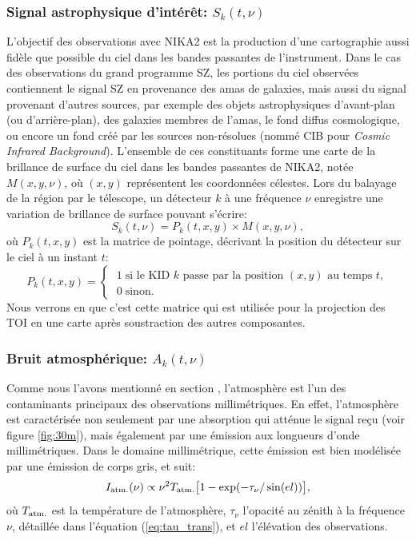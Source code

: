 \subsubsection{Signal astrophysique d'intérêt: $S_k(t, \nu)$} %
L'objectif des observations avec NIKA2 est la production d'une cartographie aussi fidèle que possible du ciel dans les bandes passantes de l'instrument.
Dans le cas des observations du grand programme SZ, les portions du ciel observées contiennent le signal SZ en provenance des amas de galaxies, mais aussi du signal provenant d'autres sources, par exemple des objets astrophysiques d'avant-plan (ou d'arrière-plan), des galaxies membres de l'amas, le fond diffus cosmologique, ou encore un fond créé par les sources non-résolues (nommé CIB pour \textit{Cosmic Infrared Background}).
L'ensemble de ces constituants forme une carte de la brillance de surface du ciel dans les bandes passantes de NIKA2, notée $M(x, y, \nu)$, où $(x, y)$ représentent les coordonnées célestes.
Lors du balayage de la région par le télescope, un détecteur $k$ à une fréquence $\nu$ enregistre une variation de brillance de surface pouvant s'écrire:
\begin{equation}
    \label{eq:toi_to_map}
    S_k(t, \nu) = P_k(t, x, y) \times M(x, y, \nu),
\end{equation}
où $P_k(t, x, y)$ est la matrice de pointage, décrivant la position du détecteur sur le ciel à un instant $t$:
\begin{equation}
    \label{eq:pointing_matrix}
    P_k(t, x, y) =
        \begin{cases}
            \; 1 \;\text{si le KID $k$ passe par la position $(x, y)$ au temps $t$}, \\
            \; 0 \;\text{sinon.}
        \end{cases}
\end{equation}
Nous verrons en  que c'est cette matrice qui est utilisée pour la projection des TOI en une carte après soustraction des autres composantes.

\subsubsection{Bruit atmosphérique: $A_k(t, \nu)$} %
Comme nous l'avons mentionné en section , l'atmosphère est l'un des contaminants principaux des observations millimétriques.
En effet, l'atmosphère est caractérisée non seulement par une absorption qui atténue le signal reçu (voir figure \ref{fig:30m}), mais également par une émission aux longueurs d'onde millimétriques.
Dans le domaine millimétrique, cette émission est bien modélisée par une émission de corps gris, et suit:
\begin{equation}
    I_{\rm atm.}(\nu) \propto \nu^2 T_{\rm atm.} \big[ 1 - \exp(-\tau_\nu / \sin(el)) \big],
\end{equation}
où $T_{\rm atm.}$ est la température de l'atmosphère, $\tau_\nu$ l'opacité au zénith à la fréquence $\nu$, détaillée dans l'équation (\ref{eq:tau_trans}), et $el$ l'élévation des observations.

